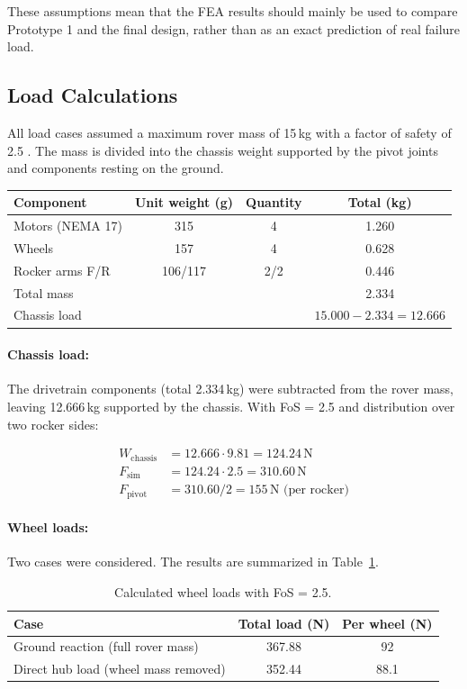 These assumptions mean that the FEA results should mainly be used to compare Prototype 1 and the final design, rather than as an exact prediction of real failure load.

\subsection{Load Calculations}

All load cases assumed a maximum rover mass of 15\,kg with a factor of safety of 2.5 \cite{NASA_STD5001B}.
The mass is divided into the chassis weight supported by the pivot joints and components resting on the ground.

\begin{tabularx}{\textwidth}{|X|c|c|c|}
    \hline
    \textbf{Component} & \textbf{Unit weight (g)} & \textbf{Quantity} & \textbf{Total (kg)} \\
    \hline
    Motors (NEMA 17) & 315 & 4 & 1.260 \\
    \hline
    Wheels & 157 & 4 & 0.628 \\
    \hline
    Rocker arms F/R & 106/117 & 2/2 & 0.446 \\
    \hline
    Total mass & & & 2.334 \\
    \hline
    Chassis load & & & \(15.000 - 2.334 = 12.666\) \\
    \hline
\end{tabularx}
\paragraph{Chassis load:}
The drivetrain components (total 2.334\,kg) were subtracted from the rover mass, leaving 12.666\,kg supported by the chassis. With FoS = 2.5 and distribution over two rocker sides:

\begin{align*}
W_{\text{chassis}} &= 12.666 \cdot 9.81 = 124.24\,\text{N} \\
F_{\text{sim}} &= 124.24 \cdot 2.5 = 310.60\,\text{N} \\
F_{\text{pivot}} &= 310.60 / 2 = 155\,\text{N (per rocker)}
\end{align*}

\paragraph{Wheel loads:}
Two cases were considered. The results are summarized in Table~\ref{tab:wheel_loads}.

\begin{table}[H]
\centering
\begin{tabular}{l|c|c}
\textbf{Case} & \textbf{Total load (N)} & \textbf{Per wheel (N)} \\ \hline
Ground reaction (full rover mass) & 367.88 & 92 \\
Direct hub load (wheel mass removed) & 352.44 & 88.1 \\
\end{tabular}
\caption{Calculated wheel loads with FoS = 2.5.}
\label{tab:wheel_loads}
\end{table}

